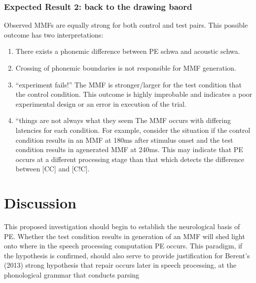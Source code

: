 \documentclass[jou,apacite]{apa6}
\begin{document}
        \subsubsection{Expected Result 2: back to the drawing baord}
        Observed MMFs are equally strong for both control and test pairs. This possible outcome has two interpretations:

            \begin{enumerate}
                \item There exists a phonemic difference between PE schwa and acoustic schwa.
                \item Crossing of phonemic boundaries is not responsible for MMF generation.
                \item “experiment fails!” The MMF is stronger/larger for the test condition that the control condition. This outcome is highly improbable and indicates a poor experimental design or an error in execution of the trial.
                \item “things are not always what they seem The MMF occurs with differing latencies for each condition. For example, consider the situation if the control condition results in an MMF at 180ms after stimulus onset and the test condition results in agenerated MMF at 240ms. This may indicate that PE occurs at a different processing stage than that which detects the difference between [CC] and [C!C].
            \end{enumerate}

\section{Discussion}

This proposed investigation should begin to establish the neurological basis of PE. Whether the test condition results in generation of an MMF will shed light onto where in the speech processing computation PE occurs. This paradigm, if the hypothesis is confirmed, should also serve to provide justification for Berent’s (2013) strong hypothesis that repair occurs later in speech processing, at the phonological grammar that conducts parsing


\end{document}

